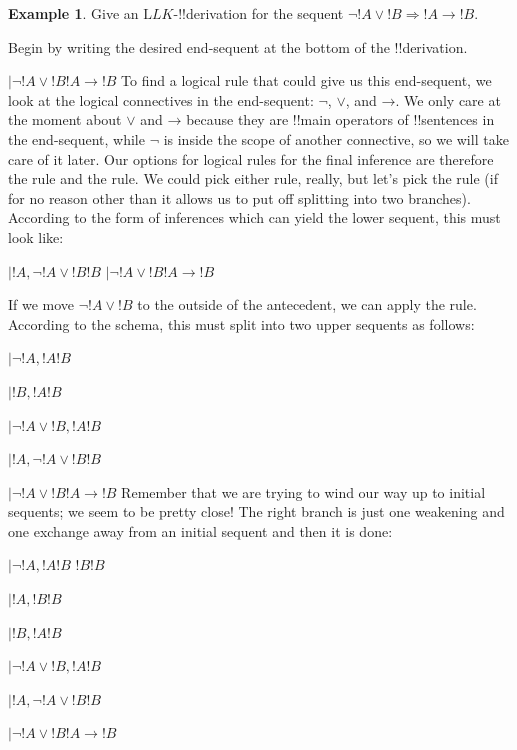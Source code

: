 \documentclass[10pt,a4paper]{article}
\theoremstyle{plain}
\theoremstyle{definition}
\newtheorem{ex}[thm]{Example}
\theoremstyle{remark}
\providecommand{\AxiomC}[1]{}
\providecommand{\RightLabel}[1]{}
\providecommand{\fCenter}{}
\newenvironment{prooftree}{}{}
\providecommand{\lif}{\mathbin{\rightarrow}}
\providecommand{\Sequent}{\mathrel{\Rightarrow}}
\providecommand{\Log}{\ensuremath{\mathrm{L}}}
\providecommand{\LeftR}[1]{}
\providecommand{\RightR}[1]{}
\providecommand{\UnaryInf}{\ensuremath{\mid}}
\providecommand{\BinaryInf}{\ensuremath{\mid}}
\providecommand{\Weakening}{\mathrm{Wk}}
\providecommand{\RightR}{\mathrm{R}}
\providecommand{\LeftR}{\mathrm{L}}
\providecommand{\Axiom}{\mathrm{Ax}}
\begin{document}
\begin{ex}
Give an $\Log{LK}$-!!{derivation} for the sequent $\lnot !A \lor !B
\Sequent !A \lif !B$.

Begin by writing the desired end-sequent at the bottom of the !!{derivation}.
\begin{prooftree}
\AxiomC{}
\UnaryInf$\lnot !A \lor !B \fCenter !A \lif !B$
\end{prooftree}
To find a logical rule that could give us this end-sequent, we look at
the logical connectives in the end-sequent: $\lnot$, $\lor$, and
$\lif$. We only care at the moment about $\lor$ and $\lif$ because
they are !!{main operator}s of !!{sentence}s in the end-sequent,
while $\lnot$ is inside the scope of another connective, so we will
take care of it later. Our options for logical rules for the final
inference are therefore the \LeftR{\lor} rule and the \RightR{\lif}
rule. We could pick either rule, really, but let's pick the \RightR{\lif}
rule (if for no reason other than it allows us to put off
splitting into two branches). According to the form of \RightR{\lif}
inferences which can yield the lower sequent, this must look like:
\begin{prooftree}
\AxiomC{}
\UnaryInf$ !A, \lnot !A \lor !B \fCenter !B $
\RightLabel{\RightR{\lif}} \UnaryInf$ \lnot !A \lor !B \fCenter !A \lif !B $
\end{prooftree}

If we move $\lnot !A \lor !B$ to the outside of the antecedent, we can
apply the \LeftR{\lor} rule. According to the schema, this must split
into two upper sequents as follows:
\begin{prooftree}
\AxiomC{}
\UnaryInf$\lnot !A, !A \fCenter !B$
\AxiomC{}
\UnaryInf$!B, !A \fCenter !B$
\RightLabel{\LeftR{\lor}}
\BinaryInf$ \lnot !A \lor !B, !A \fCenter !B $
\RightLabel{\RightR{\Exchange}}
\UnaryInf$ !A, \lnot !A \lor !B \fCenter !B $
\RightLabel{\RightR{\lif}}
\UnaryInf$ \lnot !A \lor !B \fCenter !A \lif !B $
\end{prooftree}
Remember that we are trying to wind our way up to initial sequents; we
seem to be pretty close!{} The right branch is just one weakening and
one exchange away from an initial sequent and then it is done:
\begin{prooftree}
\AxiomC{}
\UnaryInf$\lnot !A, !A \fCenter !B$
\Axiom$!B \fCenter !B$
\RightLabel{\LeftR{\Weakening}}
\UnaryInf$!A, !B \fCenter !B$
\RightLabel{\LeftR{\Exchange}}
\UnaryInf$!B, !A \fCenter !B$
\RightLabel{\LeftR{\lor}}
\BinaryInf$\lnot !A \lor !B, !A \fCenter !B $
\RightLabel{\RightR{\Exchange}}
\UnaryInf$ !A, \lnot !A \lor !B \fCenter !B $
\RightLabel{\RightR{\lif}}
\UnaryInf$ \lnot !A \lor !B \fCenter !A \lif !B $
\end{prooftree}


\end{ex}
\end{document}
